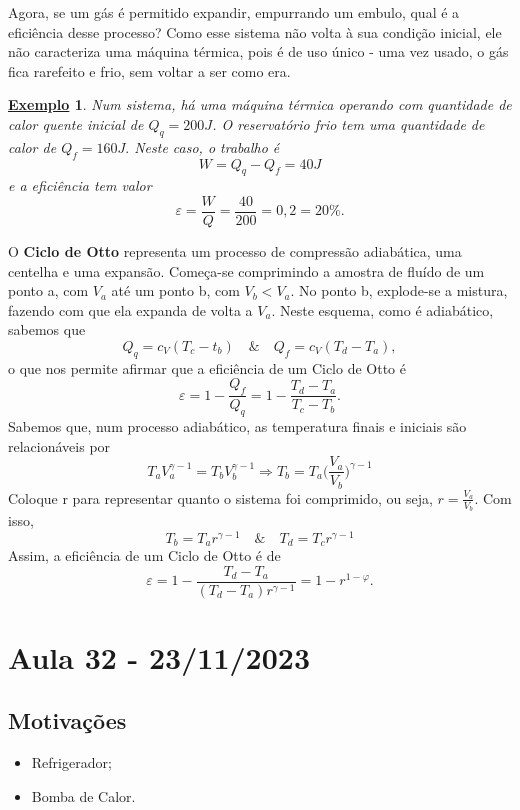 \documentclass{article}
\newtheorem{example}{\underline{Exemplo}}
\begin{document}
Agora, se um gás é permitido expandir, empurrando um embulo, qual é a eficiência desse processo? Como esse sistema não volta à sua condição
inicial, ele não caracteriza uma máquina térmica, pois é de uso único - uma vez usado, o gás fica rarefeito e frio, sem voltar a ser como era.
\begin{example}
  Num sistema, há uma máquina térmica operando com quantidade de calor quente inicial de \(Q_{q} = 200J\). O reservatório frio
  tem uma quantidade de calor de \(Q_{f} = 160J.\) Neste caso, o trabalho é 
  \[
    W = Q_{q} - Q_{f} = 40J
  \]
  e a eficiência tem valor 
  \[
    \varepsilon = \frac{W}{Q} = \frac{40}{200} = 0,2 = 20\%.
  \]
\end{example}
O \textbf{Ciclo de Otto} representa um processo de compressão adiabática, uma centelha e uma expansão. Começa-se comprimindo a amostra de fluído de um ponto a, com \(V_{a}\) até um ponto b, com \(V_{b} < V_{a}.\)
No ponto b, explode-se a mistura, fazendo com que ela expanda de volta a \(V_{a}.\) Neste esquema, como é adiabático, sabemos que
\[
  Q_{q} = c_{V}(T_{c}-t_{b})\quad\&\quad Q_{f} = c_{V}(T_{d}-T_{a}),
\]
o que nos permite afirmar que a eficiência de um Ciclo de Otto é 
\[
  \varepsilon  = 1 - \frac{Q_{f}}{Q_{q}} = 1 - \frac{T_{d} - T_{a}}{T_{c} - T_{b}}.
\]
Sabemos que, num processo adiabático, as temperatura finais e iniciais são relacionáveis por 
  \[
    T_{a}V_{a}^{\gamma -1} = T_{b}V_{b}^{\gamma -1} \Rightarrow T_{b} = T_{a}\biggl(\frac{V_{a}}{V_{b}}\biggr)^{\gamma -1}
  \]
Coloque r para representar quanto o sistema foi comprimido, ou seja, \(r = \frac{V_{a}}{V_{b}}\). Com isso,
  \[
    T_{b} = T_{a}r^{\gamma -1}\quad\&\quad T_{d} = T_{c}r^{\gamma -1}
  \]
Assim, a eficiência de um Ciclo de Otto é de
  \[
    \varepsilon = 1 - \frac{T_{d}-T_{a}}{(T_{d}-T_{a})r^{\gamma -1}}= 1 - r^{1-\varphi }.
  \]
\newpage

\section{Aula 32 - 23/11/2023}
\subsection{Motivações}
\begin{itemize}
  \item Refrigerador;
  \item Bomba de Calor.
\end{itemize}
\end{document}
